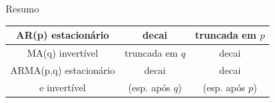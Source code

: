 \documentclass[11pt]{beamer}
\begin{document}
\begin{frame}{Resumo}
\begin{table}[H]
\begin{center}
\begin{tabular}{c|c|c}

				AR(p) estacionário& decai  & truncada em $p$  \\
				\hline
				MA(q) invertível& truncada em $q$ & decai   \\
				\hline
				ARMA(p,q) estacionário  & decai  & decai  \\
				e invertível& (esp. após $q$) & (esp. após $p$)
			\end{tabular}
		\end{center}
	\end{table}
\end{frame}
\end{document}
